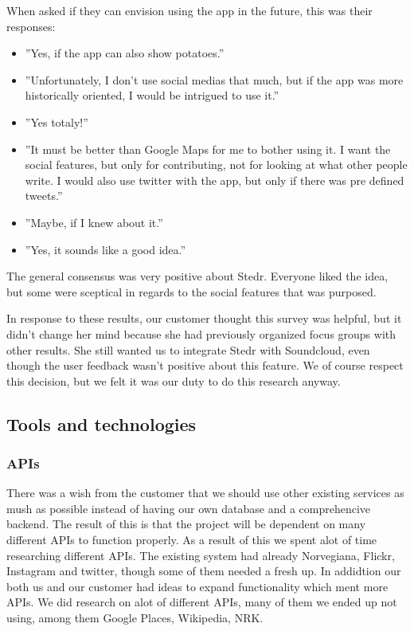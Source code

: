 	When asked if they can envision using the app in the future, this was their responses:
\begin{itemize}
	\item ”Yes, if the app can also show potatoes.”
	\item ”Unfortunately, I don't use social medias that much, but if the app was more historically oriented, I would be intrigued to use it.”
	\item ”Yes totaly!”
	\item ”It must be better than Google Maps for me to bother using it. I want the social features, but only for contributing, not for looking at what other people write. I would also use twitter with the app, but only if there was pre defined tweets.”
	\item”Maybe, if I knew about it.”
	\item ”Yes, it sounds like a good idea.”
\end{itemize}

	The general consensus was very positive about Stedr. Everyone liked the idea, but some were sceptical in regards to the social features that was purposed.

	In response to these results, our customer thought this survey was helpful, but it didn't change her mind because she had previously organized focus groups with other results. She still wanted us to integrate Stedr with Soundcloud, even though the user feedback wasn't positive about this feature. We of course respect this decision, but we felt it was our duty to do this research anyway.
	
	\subsection{Tools and technologies}
	
		\subsubsection{APIs}
		
		There was a wish from the customer that we should use other existing services as mush as possible instead of having our own database and a comprehencive backend. The result of this is that the project will be dependent on many different APIs to function properly. As a result of this we spent alot of time researching different APIs. The existing system had already Norvegiana, Flickr, Instagram and twitter, though some of them needed a fresh up. In addidtion our both us and our customer had ideas to expand functionality which ment more APIs. We did research on alot of different APIs, many of them we ended up not using, among them Google Places, Wikipedia, NRK. 
		
